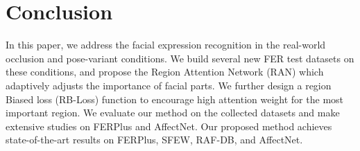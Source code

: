 \documentclass[journal]{IEEEtran}
\begin{document}
 
\section{Conclusion}
In this paper, we address the facial expression recognition in the real-world occlusion and pose-variant conditions. We build several new FER test datasets on these conditions, and propose the Region Attention Network (RAN) which adaptively adjusts the importance of facial parts. We further design a region Biased loss (RB-Loss) function to encourage high attention weight for the most important region. We evaluate our method on the collected datasets and make extensive studies on FERPlus and AffectNet. Our proposed method achieves state-of-the-art results on FERPlus, SFEW, RAF-DB, and AffectNet. 



\IEEEpeerreviewmaketitle
\end{document}
